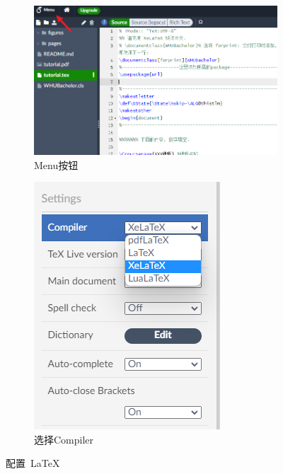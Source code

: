 \begin{figure}[H]
  \centering
  \begin{subfigure}{0.55\textwidth}
    \includegraphics[width=\linewidth]{figures/chapter2/menu.png}
    \caption{Menu按钮}
    \label{fig:2-menu}
  \end{subfigure}\qquad
  \begin{subfigure}{0.3\textwidth}
    \includegraphics[width=\linewidth]{figures/chapter2/xelatex.png}
    \caption{选择Compiler}
    \label{fig:2-compiler}
  \end{subfigure}
  \caption{配置~\LaTeX~}
  \label{fig:2-latex-conf}
\end{figure}


